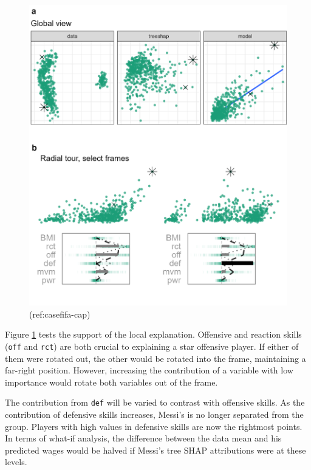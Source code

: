 \documentclass[
]{jss}
\begin{document}
\begin{CodeChunk}
\begin{figure}

{\centering \includegraphics[width=0.9\linewidth]{./figures/case_fifa} 

}

\caption[(ref:casefifa-cap)]{(ref:casefifa-cap)}\label{fig:casefifa}
\end{figure}
\end{CodeChunk}

Figure \ref{fig:casefifa} tests the support of the local explanation.
Offensive and reaction skills (\texttt{off} and \texttt{rct}) are both
crucial to explaining a star offensive player. If either of them were
rotated out, the other would be rotated into the frame, maintaining a
far-right position. However, increasing the contribution of a variable
with low importance would rotate both variables out of the frame.

The contribution from \texttt{def} will be varied to contrast with
offensive skills. As the contribution of defensive skills increases,
Messi's is no longer separated from the group. Players with high values
in defensive skills are now the rightmost points. In terms of what-if
analysis, the difference between the data mean and his predicted wages
would be halved if Messi's tree SHAP attributions were at these levels.
\end{document}
